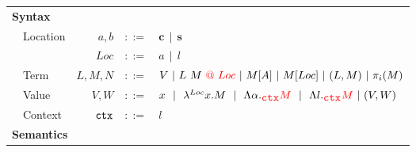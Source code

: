 \documentclass[a4paper]{article}
\makeatletter
\theoremstyle{plain}
\theoremstyle{definition}
\newcommand{\ruleverticalsep}{0.5cm}
\newcommand{\client}{\textbf{c}}
\newcommand{\server}{\textbf{s}}
\newcommand{\Loc}{Loc}
\newcommand{\at}[1]{@#1}
\newcommand{\eff}{\mbox{\texttt{ctx}}}
\makeatother
\begin{document}
\begin{figure}[h]
\centering
\begin{tabular}{ l  l  r  c  l }
\multicolumn{5}{l}{\textbf{Syntax}} \\
 & Location & $a,b$   & $::=$ & $\client \ \ | \  \  \server$ \\
 &          & $\Loc$  & $::=$  & $a  \ \ |  \ \ l$ \\
 & Term     & $L,M,N$ & $::=$  & $V  \ | \  L \ M \ {\color{red}\at{\ \Loc}} \ | \  M[A]  \ | \  M[\Loc]  \ | \  (L,M)  \ |  \ \pi_i(M)$ \\
 & Value & $V,W$ & $::=$ & $x  \ \ |  \ \ \lambda^{Loc} x.M  \ \ |  \ \ \Lambda\alpha._{\color{red} \eff} {\color{red} M}  \ \ |  \ \ \Lambda l._{\color{red} \eff} {\color{red} M} \ | \ (V,W)$ \\
 & Context  & $\eff$  & $::=$ & $l$ \\[\ruleverticalsep]
\multicolumn{5}{l}{\textbf{Semantics}} \\
\end{tabular}


\end{figure}
\end{document}
